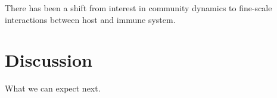 \documentclass{amsart}
\newcommand{\forarxiv}[1]{#1}
\newcommand{\notforarxiv}[1]{}
\newcommand{\FIGmassTransport}{\
\begin{figure}[ht]
\begin{center}
  \forarxiv{\texttt{[image: mass\_transport.pdf]}}
\end{center}
\caption{\
  Caption goes here.
}
\label{FIGmassTransport}
\end{figure}
}
\begin{document}
There has been a shift from interest in community dynamics to fine-scale interactions between host and immune system.


\cite{wylie2012sequence}
\cite{chen2012associating}


\section{Discussion}

What we can expect next.

\notforarxiv{
\newpage
\section{Figure Legends}
\clearpage

\newpage
}



\end{document}
